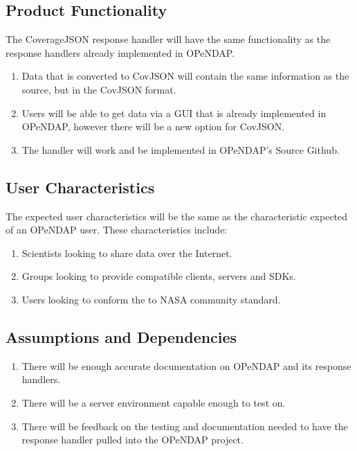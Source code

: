 \documentclass[onecolumn, draftclsnofoot,10pt, compsoc]{IEEEtran}
\begin{document}
\subsection{Product Functionality}
The CoverageJSON response handler will have the same functionality as the response handlers already implemented in OPeNDAP.
\begin{enumerate}
\item Data that is converted to CovJSON will contain the same information as the source, but in the CovJSON format. 
\item Users will be able to get data via a GUI that is already implemented in OPeNDAP, however there will be a new option for CovJSON. 
\item The handler will work and be implemented in OPeNDAP's Source Github. 
\end{enumerate}

\subsection{User Characteristics}
The expected user characteristics will be the same as the characteristic expected of an OPeNDAP user.
These characteristics include:
\begin{enumerate}
\item Scientists looking to share data over the Internet.
\item Groups looking to provide compatible clients, servers and SDKs.
\item Users looking to conform the to NASA community standard.

\end{enumerate}

\subsection{Assumptions and Dependencies}
\begin{enumerate}
\item There will be enough accurate documentation on OPeNDAP and its response handlers.
\item There will be a server environment capable enough to test on.
\item There will be feedback on the testing and documentation needed to have the response handler pulled into the OPeNDAP project.
\end{enumerate}
\end{document}
